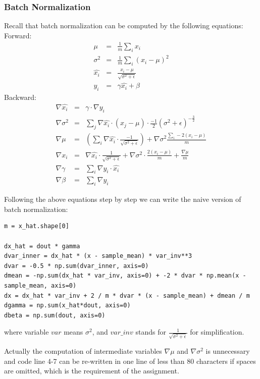 \documentclass{article} %
\begin{document}
\subsubsection{Batch Normalization}
Recall that batch normalization can be computed by the following equations:
Forward:
\begin{eqnarray*}
	\mu &=& \frac{1}{m} \sum_i x_i\\
	\sigma^2 &=& \frac{1}{m}\sum_i (x_i-\mu)^2\\
	\hat{x_i} &=& \frac{x_i-\mu}{\sqrt{\sigma^2+\epsilon}}\\
	y_i &=& \gamma \hat{x_i} + \beta
\end{eqnarray*}
Backward:
\begin{eqnarray*}
	\nabla \hat{x_i} &=& \gamma \cdot \nabla y_i\\
	\nabla \sigma^2 &=& \sum_j \nabla \hat{x_i} \cdot (x_j - \mu) \cdot \frac{-1}{2} (\sigma^2 + \epsilon)^{-\frac{3}{2}}\\
	\nabla \mu &=& \left(\sum_i \nabla \hat{x_i} \cdot \frac{-1}{\sqrt{\sigma^2+\epsilon}}\right) + \nabla{\sigma^2} \frac{\sum_i -2(x_i-\mu)}{m}\\
	\nabla x_i &=& \nabla \hat{x_i} \cdot \frac{1}{\sqrt{\sigma^2 + \epsilon}} + \nabla \sigma^2 \cdot \frac{2(x_i-\mu)}{m} + \frac{\nabla{\mu}}{m}\\
	\nabla \gamma &=& \sum_i \nabla y_i \cdot \hat{x_i}\\
	\nabla \beta &=& \sum_i \nabla y_i
\end{eqnarray*}

Following the above equations step by step we can write the naive version of batch normalization:
\begin{lstlisting}
m = x_hat.shape[0]

dx_hat = dout * gamma
dvar_inner = dx_hat * (x - sample_mean) * var_inv**3
dvar = -0.5 * np.sum(dvar_inner, axis=0)
dmean = -np.sum(dx_hat * var_inv, axis=0) + -2 * dvar * np.mean(x - sample_mean, axis=0)
dx = dx_hat * var_inv + 2 / m * dvar * (x - sample_mean) + dmean / m
dgamma = np.sum(x_hat*dout, axis=0)
dbeta = np.sum(dout, axis=0)
\end{lstlisting}
where variable $var$ means $\sigma^2$, and $var\_inv$ stands for $\frac{1}{\sqrt{\sigma^2+\epsilon}}$ for simplification.

Actually the computation of intermediate variables $\nabla \mu$ and $\nabla \sigma^2$ is unnecessary and code line 4-7 can be re-written in one line of less than 80 characters if spaces are omitted, which is the requirement of the assignment.
\end{document}
